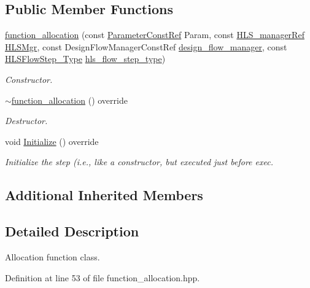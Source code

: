 \subsection*{Public Member Functions}
\begin{DoxyCompactItemize}
\item 
\hyperlink{classfunction__allocation_a95a2089801528c281abdf8188b0c8d1f}{function\+\_\+allocation} (const \hyperlink{Parameter_8hpp_a37841774a6fcb479b597fdf8955eb4ea}{Parameter\+Const\+Ref} Param, const \hyperlink{hls__manager_8hpp_acd3842b8589fe52c08fc0b2fcc813bfe}{H\+L\+S\+\_\+manager\+Ref} \hyperlink{classHLS__step_ade85003a99d34134418451ddc46a18e9}{H\+L\+S\+Mgr}, const Design\+Flow\+Manager\+Const\+Ref \hyperlink{classDesignFlowStep_ab770677ddf087613add30024e16a5554}{design\+\_\+flow\+\_\+manager}, const \hyperlink{hls__step_8hpp_ada16bc22905016180e26fc7e39537f8d}{H\+L\+S\+Flow\+Step\+\_\+\+Type} \hyperlink{classHLS__step_aefd59af15346ec3f10bf12bd756e6777}{hls\+\_\+flow\+\_\+step\+\_\+type})
\begin{DoxyCompactList}\small\item\em Constructor. \end{DoxyCompactList}\item 
\hyperlink{classfunction__allocation_a2d9c00c0efcdf85095888b683d6a5054}{$\sim$function\+\_\+allocation} () override
\begin{DoxyCompactList}\small\item\em Destructor. \end{DoxyCompactList}\item 
void \hyperlink{classfunction__allocation_a48d784232dd4383a11ff009a3cd78b30}{Initialize} () override
\begin{DoxyCompactList}\small\item\em Initialize the step (i.\+e., like a constructor, but executed just before exec. \end{DoxyCompactList}\end{DoxyCompactItemize}
\subsection*{Additional Inherited Members}


\subsection{Detailed Description}
Allocation function class. 

Definition at line 53 of file function\+\_\+allocation.\+hpp.



